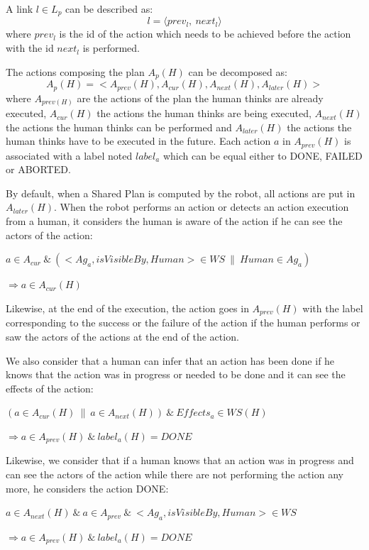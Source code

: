 \documentclass[english,a4paper,11pt,twoside]{StyleThese}
\begin{document}
A link $l \in L_p$ can be described as:
 $$l = \langle prev_l, \ next_l \rangle$$
where $prev_l$ is the id of the action which needs to be achieved before the action with the id $next_l$ is performed. 

The actions composing the plan $A_p(H)$ can be decomposed as:
$$A_p(H) = <A_{prev}(H), A_{cur}(H), A_{next}(H), A_{later}(H)>$$
where $A_{prev(H)}$ are the actions of the plan the human thinks are already executed, $A_{cur}(H)$ the actions the human thinks are being executed, $A_{next}(H)$ the actions the human thinks  can be performed and $A_{later}(H)$ the actions the human thinks have to be executed in the future. Each action $a$ in $A_{prev}(H)$ is associated with a label noted $label_a$ which can be equal either to DONE, FAILED or ABORTED.

By default, when a Shared Plan is computed by the robot, all actions are put in $A_{later}(H)$. When the robot performs an action or detects an action execution from a human, it considers the human is aware of the action if he can see the actors of the action:

\begin{center}
$a \in A_{cur} \ \& \ (<Ag_a, isVisibleBy, Human> \in WS \ \| \ Human \in Ag_a)$ 

$\Rightarrow a \in A_{cur}(H)$
\end{center}

Likewise, at the end of the execution, the action goes in $A_{prev}(H)$ with the label corresponding to the success or the failure of the action if the human performs or saw the actors of the actions at the end of the action.

We also consider that a human can infer that an action has been done if he knows that the action was in progress or needed to be done and it can see the effects of the action:

\begin{center}
$(a \in A_{cur}(H) \ \| \ a \in A_{next}(H)) \ \& \ Effects_{a} \in WS(H)$ 

$\Rightarrow a \in A_{prev}(H) \ \& \ label_a(H) = DONE$
\end{center}

Likewise, we consider that if a human knows that an action was in progress and can see the actors of the action while there are not performing the action any more, he considers the action DONE:

\begin{center}
$a \in A_{next}(H) \ \& \ a \in A_{prev} \ \& \ <Ag_a, isVisibleBy, Human> \in WS$

$\Rightarrow a \in A_{prev}(H) \ \& \ label_a(H) = DONE$
\end{center}
\end{document}

